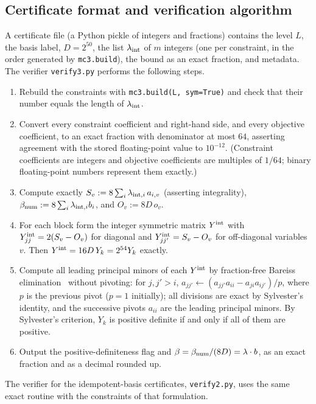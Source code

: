 \documentclass[aps,pra,onecolumn,notitlepage,superscriptaddress,longbibliography,nofootinbib,11pt]{revtex4-2}
\theoremstyle{remark}
\newcommand{\file}[1]{\texttt{#1}}
\begin{document}
\subsection{Certificate format and verification algorithm}\label{sec:cert-verify}

A certificate file (a Python pickle of integers and fractions) contains the level $L$, the basis label, $D=2^{50}$, the list $\lambda_{\rm int}$ of $m$ integers (one per constraint, in the order generated by \file{mc3.build}), the bound as an exact fraction, and metadata. The verifier \file{verify3.py} performs the following steps.
\begin{enumerate}
\item Rebuild the constraints with \file{mc3.build(L, sym=True)} and check that their number equals the length of $\lambda_{\rm int}$.
\item Convert every constraint coefficient and right-hand side, and every objective coefficient, to an exact fraction with denominator at most $64$, asserting agreement with the stored floating-point value to $10^{-12}$. (Constraint coefficients are integers and objective coefficients are multiples of $1/64$; binary floating-point numbers represent them exactly.)
\item Compute exactly $S_v:=8\sum_i\lambda_{{\rm int},i}\,a_{i,v}$ (asserting integrality), $\beta_{\rm num}:=8\sum_i\lambda_{{\rm int},i}b_i$, and $O_v:=8D\,o_v$.
\item For each block form the integer symmetric matrix $Y^{\rm int}$ with $Y^{\rm int}_{jj}=2(S_v-O_v)$ for diagonal and $Y^{\rm int}_{jj'}=S_v-O_v$ for off-diagonal variables $v$. Then $Y^{\rm int}=16D\,Y_k=2^{54}Y_k$ exactly.
\item Compute all leading principal minors of each $Y^{\rm int}$ by fraction-free Bareiss elimination~\cite{Bareiss1968} without pivoting: for $j,j'>i$, $a_{jj'}\leftarrow(a_{jj'}a_{ii}-a_{ji}a_{ij'})/p$, where $p$ is the previous pivot ($p=1$ initially); all divisions are exact by Sylvester's identity, and the successive pivots $a_{ii}$ are the leading principal minors. By Sylvester's criterion, $Y_k$ is positive definite if and only if all of them are positive.
\item Output the positive-definiteness flag and $\beta=\beta_{\rm num}/(8D)=\lambda\cdot b$, as an exact fraction and as a decimal rounded up.
\end{enumerate}
The verifier for the idempotent-basis certificates, \file{verify2.py}, uses the same exact routine with the constraints of that formulation.
\end{document}
